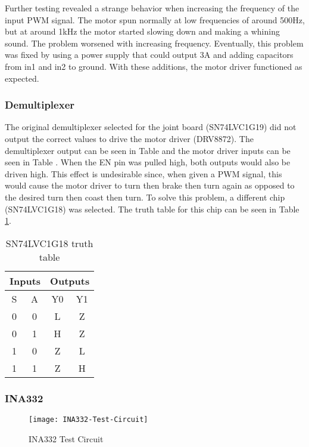 \noindent Further testing revealed a strange behavior when increasing the frequency of the input PWM signal. The motor spun normally at low frequencies of around 500Hz, but at around 1kHz the motor started slowing down and making a whining sound. The problem worsened with increasing frequency. Eventually, this problem was fixed by using a power supply that could output 3A and adding capacitors from in1 and in2 to ground. With these additions, the motor driver functioned as expected.


\subsubsection{Demultiplexer}
The original demultiplexer selected for the joint board (SN74LVC1G19) did not output the correct values to drive the motor driver (DRV8872). The demultiplexer output can be seen in Table  and the motor driver inputs can be seen in Table . When the EN pin was pulled high, both outputs would also be driven high. This effect is undesirable since, when given a PWM signal, this would cause the motor driver to turn then brake then turn again as opposed to the desired turn then coast then turn. To solve this problem, a different chip (SN74LVC1G18) was selected. The truth table for this chip can be seen in Table \ref{tbl:sn74lvc1g18-truth}.
\begin{table}[H]
	\centering
	\caption{SN74LVC1G18 truth table}
	\begin{tabular}{| c  c | c  c| }
		\hline
		\multicolumn{2}{|c|}{Inputs} & \multicolumn{2}{c|}{Outputs} \\
		\hline
		S & A & Y0 & Y1 \\
		\hline
		0 & 0 & L & Z \\
		0 & 1 & H & Z \\
		1 & 0 & Z & L \\
		1 & 1 & Z & H \\
		\hline
	\end{tabular}
	\label{tbl:sn74lvc1g18-truth}
\end{table}

\subsubsection{INA332}
\label{sec:meth-ina332}

\begin{figure}[H]
	\centering
	\texttt{[image: INA332-Test-Circuit]}
	\caption{INA332 Test Circuit}
	\label{fig:INA332_Test_Circuit}
\end{figure}

